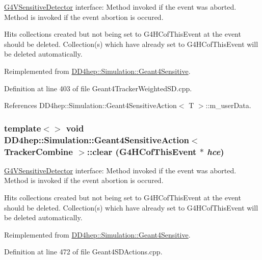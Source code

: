 \hyperlink{class_g4_v_sensitive_detector}{G4VSensitiveDetector} interface: Method invoked if the event was aborted. Method is invoked if the event abortion is occured.

Hits collections created but not being set to G4HCofThisEvent at the event should be deleted. Collection(s) which have already set to G4HCofThisEvent will be deleted automatically. 

Reimplemented from \hyperlink{class_d_d4hep_1_1_simulation_1_1_geant4_sensitive_a3bb1c2f79261a98e83ec22102281d117}{DD4hep::Simulation::Geant4Sensitive}.

Definition at line 403 of file Geant4TrackerWeightedSD.cpp.

References DD4hep::Simulation::Geant4SensitiveAction$<$ T $>$::m\_\-userData.\hypertarget{class_d_d4hep_1_1_simulation_1_1_geant4_sensitive_action_aa7ffb4125e622d9eb08bfd4901a643fd}{
\subsubsection[{clear}]{\setlength{\rightskip}{0pt plus 5cm}template$<$$>$ void {\bf DD4hep::Simulation::Geant4SensitiveAction}$<$ {\bf TrackerCombine} $>$::clear (G4HCofThisEvent $\ast$ {\em hce})}}
\label{class_d_d4hep_1_1_simulation_1_1_geant4_sensitive_action_aa7ffb4125e622d9eb08bfd4901a643fd}


\hyperlink{class_g4_v_sensitive_detector}{G4VSensitiveDetector} interface: Method invoked if the event was aborted. Method is invoked if the event abortion is occured.

Hits collections created but not being set to G4HCofThisEvent at the event should be deleted. Collection(s) which have already set to G4HCofThisEvent will be deleted automatically. 

Reimplemented from \hyperlink{class_d_d4hep_1_1_simulation_1_1_geant4_sensitive_a3bb1c2f79261a98e83ec22102281d117}{DD4hep::Simulation::Geant4Sensitive}.

Definition at line 472 of file Geant4SDActions.cpp.

